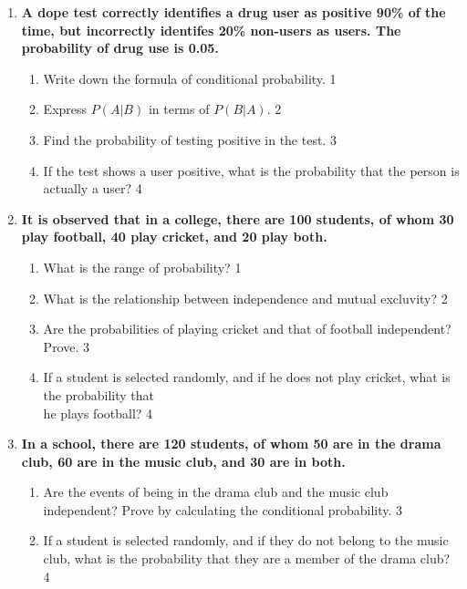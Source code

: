\documentclass[a4paper,oneside, margin=1.4in]{book}
\begin{document}
\begin{enumerate}
  
  \item
	  \textbf{A dope test correctly identifies a drug user as positive 90\%  of the time, but incorrectly identifes 20\% non-users as users. The probability of drug use is 0.05.} 
  
  \begin{enumerate}
    \item
	Write down the formula of conditional probability. \hfill 1
    \item
	Express $P(A|B)$ in terms of $P(B|A)$. \hfill 2
    \item  
	Find the probability of testing positive in the test. \hfill 3
    \item
	If the test shows a user positive, what is the probability that the person is actually a user? \hfill 4
  \end{enumerate}
  
  \item
  \textbf{It is observed that in a college, there are 100 students, of whom 30 play football, 40 play cricket, and 20 play both.}
 
  \begin{enumerate}
    \item
	What is the range of probability? \hfill 1
    \item
    	What is the relationship between independence and mutual excluvity?  \hfill 2
    \item
    	Are the probabilities of playing cricket and that of football independent? Prove. \hfill 3
     \item
     	If a student is selected randomly, and if he does not play cricket, what is the probability that \\ he plays football? \hfill 4
  \end{enumerate}
  
  \item  
  \textbf{In a school, there are 120 students, of whom 50 are in the drama club, 60 are in the music club, and 30 are in both.}  

  \begin{enumerate}  
    \item  
    	Are the events of being in the drama club and the music club independent? Prove by calculating the conditional probability. \hfill 3  
    \item  
    	If a student is selected randomly, and if they do not belong to the music club, what is the probability that they are a member of the drama club? \hfill 4  
  \end{enumerate}  


\end{enumerate}
\end{document}
